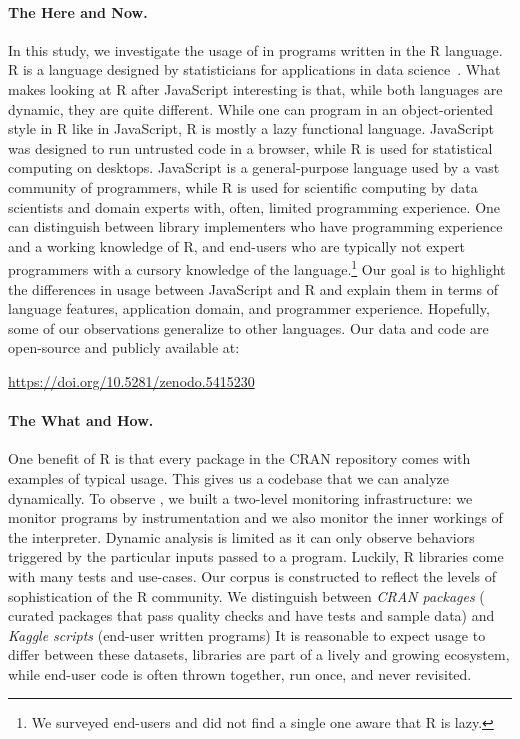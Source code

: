 \documentclass[review,screen,acmsmall]{acmart}%
\begin{document}
\paragraph{The Here and Now.} In this study, we investigate the usage of \eval
in programs written in the R language. R is a language designed by statisticians
for applications in data science~\cite{r,R96}. What makes looking at R after
JavaScript interesting is that, while both languages are dynamic, they are quite
different. While one can program in an object-oriented style in R like in
JavaScript, R is mostly a lazy functional language. JavaScript was designed to
run untrusted code in a browser, while R is used for statistical computing on
desktops. JavaScript is a general-purpose language used by a vast community of
programmers, while R is used for scientific computing by data scientists and
domain experts with, often, limited programming experience. One can distinguish
between library implementers who have programming experience and a working
knowledge of R, and end-users who are typically not expert programmers with a
cursory knowledge of the language.\footnote{We surveyed end-users and did not
  find a single one aware that R is lazy.} Our goal is to highlight the
differences in usage between JavaScript and R and explain them in terms of
language features, application domain, and programmer experience. Hopefully,
some of our observations generalize to other languages. Our data and code are
open-source and publicly available at:

\begin{center}
  \url{https://doi.org/10.5281/zenodo.5415230}
\end{center}

\paragraph{The What and How.} One benefit of
R is that every package in the CRAN repository comes with examples of typical
usage. This gives us a codebase that we can analyze dynamically. To observe
\eval, we built a two-level monitoring infrastructure: we monitor programs by
instrumentation and we also monitor the inner workings of the interpreter.
Dynamic analysis is limited as it can only observe behaviors triggered by the
particular inputs passed to a program. Luckily, R libraries come with many tests
and use-cases. Our corpus is constructed to reflect the levels of sophistication
of the R community. We distinguish between \emph{CRAN packages} (\CranPackages
curated packages that pass quality checks and have tests and sample data) and
\emph{Kaggle scripts} (\KaggleUnique end-user written programs) It is reasonable
to expect \eval usage to differ between these datasets, libraries are part of a
lively and growing ecosystem, while end-user code is often thrown together, run
once, and never revisited.
\end{document}
